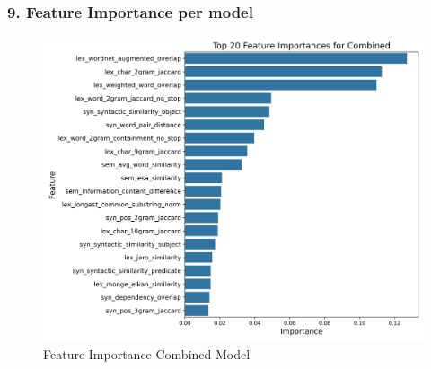 \documentclass{beamer}
\begin{document}
\begin{frame}
  \frametitle{9. Feature Importance per model}
  \begin{figure}
    \centering
    \includegraphics[width=0.7\linewidth]{img/Top_Features_Model.png}
    \caption{Feature Importance Combined Model}
  \end{figure}
\end{frame}
\end{document}
